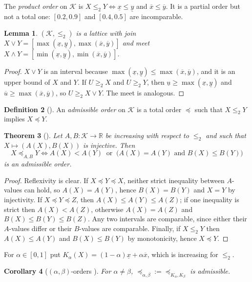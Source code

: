\documentclass[preprint,12pt]{elsarticle}
\newtheorem{theorem}{Theorem}[section]
\newtheorem{lemma}[theorem]{Lemma}
\newtheorem{corollary}[theorem]{Corollary}
\theoremstyle{definition}
\newtheorem{definition}[theorem]{Definition}
\newcommand{\R}{\mathbb{R}}
\newcommand{\K}{\mathcal{K}}
\newcommand{\lo}[1]{\underline{#1}}
\newcommand{\up}[1]{\overline{#1}}
\begin{document}
The \emph{product order} on $\K$ is $X\le_2Y\iff\lo x\le\lo y$ and $\up x\le\up y$. It is a partial order but not a total one: $[0.2,0.9]$ and $[0.4,0.5]$ are incomparable.

\begin{lemma}\label{lem:join}
$(\K,\le_2)$ is a lattice with join $X\vee Y=[\max(\lo x,\lo y),\max(\up x,\up y)]$ and meet $X\wedge Y=[\min(\lo x,\lo y),\min(\up x,\up y)]$.
\end{lemma}

\begin{proof}
$X\vee Y$ is an interval because $\max(\lo x,\lo y)\le\max(\up x,\up y)$, and it is an upper bound of $X$ and $Y$. If $U\ge_2X$ and $U\ge_2Y$, then $\lo u\ge\max(\lo x,\lo y)$ and $\up u\ge\max(\up x,\up y)$, so $U\ge_2X\vee Y$. The meet is analogous.
\end{proof}

\begin{definition}[{\cite{bustince2013orders}}]
An \emph{admissible order} on $\K$ is a total order $\preceq$ such that $X\le_2Y$ implies $X\preceq Y$.
\end{definition}

\begin{theorem}[{\cite{bustince2013orders}}]\label{thm:bustince}
Let $A,B:\K\to\R$ be increasing with respect to $\le_2$ and such that $X\mapsto(A(X),B(X))$ is injective. Then
\[
X\preceq_{A,B}Y\iff A(X)<A(Y)\ \text{ or }\ \big(A(X)=A(Y)\text{ and }B(X)\le B(Y)\big)
\]
is an admissible order.
\end{theorem}

\begin{proof}
Reflexivity is clear. If $X\preceq Y\preceq X$, neither strict inequality between $A$-values can hold, so $A(X)=A(Y)$, hence $B(X)=B(Y)$ and $X=Y$ by injectivity. If $X\preceq Y\preceq Z$, then $A(X)\le A(Y)\le A(Z)$; if one inequality is strict then $A(X)<A(Z)$, otherwise $A(X)=A(Z)$ and $B(X)\le B(Y)\le B(Z)$. Any two intervals are comparable, since either their $A$-values differ or their $B$-values are comparable. Finally, if $X\le_2Y$ then $A(X)\le A(Y)$ and $B(X)\le B(Y)$ by monotonicity, hence $X\preceq Y$.
\end{proof}

For $\alpha\in[0,1]$ put $K_\alpha(X)=(1-\alpha)\lo x+\alpha\up x$, which is increasing for $\le_2$.

\begin{corollary}[$(\alpha,\beta)$-orders {\cite{bustince2013orders}}]\label{cor:abdef}
For $\alpha\ne\beta$, $\preceq_{\alpha,\beta}:=\preceq_{K_\alpha,K_\beta}$ is admissible.
\end{corollary}
\end{document}
